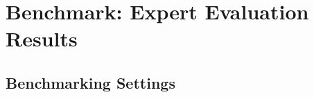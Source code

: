 \documentclass{article}
\begin{document}
 

\section{Benchmark: Expert Evaluation Results}






\subsection{Benchmarking Settings}
\end{document}
